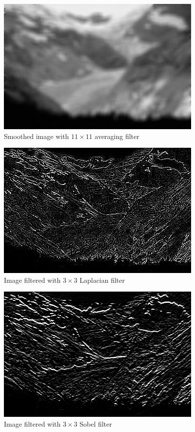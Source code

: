 \documentclass{article}
\begin{document}
\begin{figure}[H]
	\centering
	\includegraphics[width=288pt]{../result/filter-smooth-11-11.png}
	\caption{Smoothed image with $11 \times 11$ averaging filter}
\end{figure}

\begin{figure}[H]
	\centering
	\includegraphics[width=288pt]{../result/filter-laplacian.png}
	\caption{Image filtered with $3 \times 3$ Laplacian filter}
\end{figure}

\begin{figure}[H]
	\centering
	\includegraphics[width=288pt]{../result/filter-sobel-0.png}
	\caption{Image filtered with $3 \times 3$ Sobel filter}
\end{figure}
\end{document}
